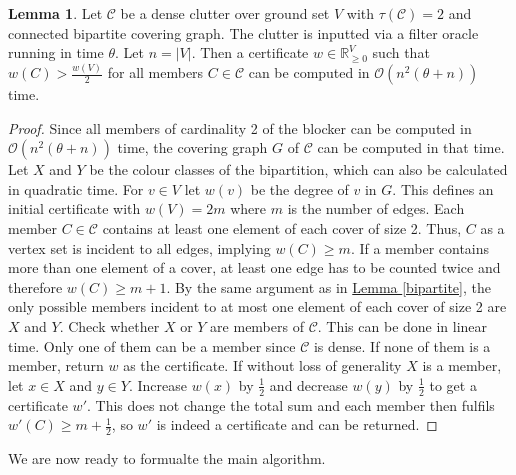 \documentclass[a4paper, 12pt]{scrbook}
\theoremstyle{definition}
\newtheorem{lemma}[theorem]{Lemma}
\newcommand*{\IR}{\ensuremath{\mathbb{R}}}
\begin{document}
   \begin{lemma}\label{computecert}
       Let $\mathcal{C}$ be a dense clutter over ground set $V$ with $\tau(\mathcal{C})=2$ and connected bipartite covering graph. The clutter is inputted via a filter oracle running in time $\theta$. Let $n=|V|$. Then a certificate $w \in \IR^V_{\geq 0}$ such that $w(C)>\frac{w(V)}{2}$ for all members $C \in \mathcal{C}$ can be computed in $\mathcal{O}(n^2(\theta+n))$ time.
   \end{lemma}

   \begin{proof}
       Since all members of cardinality 2 of the blocker can be computed in $\mathcal{O}(n^2(\theta+n))$ time, the covering graph $G$ of $\mathcal{C}$ can be computed in that time.
       Let $X$ and $Y$ be the colour classes of the bipartition, which can also be calculated in quadratic time.
       For $v \in V$ let $w(v)$ be the degree of $v$ in $G$. This defines an initial certificate with $w(V) = 2m$ where $m$ is the number of edges.
       Each member $C \in \mathcal{C}$ contains at least one element of each cover of size 2. Thus, $C$ as a vertex set is incident to all edges, implying $w(C) \geq m$.
       If a member contains more than one element of a cover, at least one edge has to be counted twice and therefore $w(C) \geq m+1$.
       By the same argument as in \hyperref[bipartite]{Lemma \ref*{bipartite}}, the only possible members incident to at most one element of each cover of size 2 are $X$ and $Y$.
       Check whether $X$ or $Y$ are members of $\mathcal{C}$. This can be done in linear time.
       Only one of them can be a member since $\mathcal{C}$ is dense.
       If none of them is a member, return $w$ as the certificate.
       If without loss of generality $X$ is a member, let $x \in X$ and $y \in Y$.
       Increase $w(x)$ by $\frac 12$ and decrease $w(y)$ by $\frac 12$ to get a certificate $w'$.
       This does not change the total sum and each member then fulfils $w'(C) \geq m + \frac 12$, so $w'$ is indeed a certificate and can be returned.
   \end{proof}
   We are now ready to formualte the main algorithm.
   \newline
\end{document}
